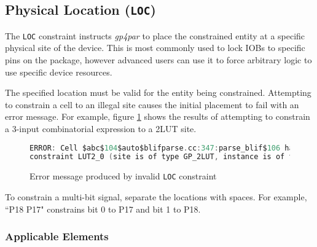 \documentclass[11pt]{article}
\newcommand{\namestyle}[1]{\textit{#1}}
\newcommand{\tokenstyle}[1]{\texttt{#1}}
\begin{document}

\pagebreak
\subsection{Physical Location (\tokenstyle{LOC})}

The \tokenstyle{LOC} constraint instructs \namestyle{gp4par} to place the constrained entity at a specific physical
site of the device. This is most commonly used to lock IOBs to specific pins on the package, however advanced users can
use it to force arbitrary logic to use specific device resources.

The specified location must be valid for the entity being constrained. Attempting to constrain a cell to an illegal
site causes the initial placement to fail with an error message. For example, figure \ref{invalid-loc} shows the
results of attempting to constrain a 3-input combinatorial expression to a 2LUT site.

\begin{figure}[h]
\begin{lstlisting}[language=c]
ERROR: Cell $abc$104$auto$blifparse.cc:347:parse_blif$106 has invalid LOC
constraint LUT2_0 (site is of type GP_2LUT, instance is of type GP_3LUT)
\end{lstlisting}
\caption{Error message produced by invalid \tokenstyle{LOC} constraint}
\label{invalid-loc}
\end{figure}

To constrain a multi-bit signal, separate the locations with spaces. For example, ``P18 P17" constrains bit 0 to P17
and bit 1 to P18.

\subsubsection{Applicable Elements}
\end{document}
